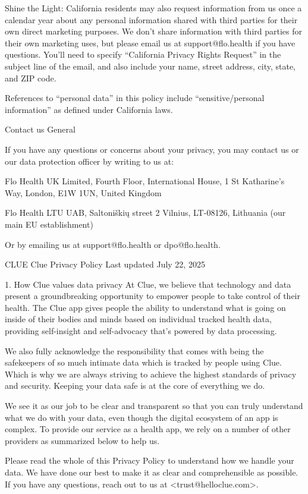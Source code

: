 Shine the Light: California residents may also request information from us once a calendar year about any personal information shared with third parties for their own direct marketing purposes. We don’t share information with third parties for their own marketing uses, but please email us at support@flo.health if you have questions. You’ll need to specify “California Privacy Rights Request” in the subject line of the email, and also include your name, street address, city, state, and ZIP code. 

References to “personal data” in this policy include “sensitive/personal information” as defined under California laws.

Contact us
General

If you have any questions or concerns about your privacy, you may contact us or our data protection officer by writing to us at:

Flo Health UK Limited, Fourth Floor, International House, 1 St Katharine’s Way, London, E1W 1UN, United Kingdom

Flo Health LTU UAB, Saltoniškių street 2 Vilnius, LT-08126, Lithuania (our main EU establishment)

Or by emailing us at support@flo.health or dpo@flo.health.


CLUE
Clue Privacy Policy
Last updated July 22, 2025

1. How Clue values data privacy
At Clue, we believe that technology and data present a groundbreaking opportunity to empower people to take control of their health. The Clue app gives people the ability to understand what is going on inside of their bodies and minds based on individual tracked health data, providing self-insight and self-advocacy that’s powered by data processing.

We also fully acknowledge the responsibility that comes with being the safekeepers of so much intimate data which is tracked by people using Clue. Which is why we are always striving to achieve the highest standards of privacy and security. Keeping your data safe is at the core of everything we do.

We see it as our job to be clear and transparent so that you can truly understand what we do with your data, even though the digital ecosystem of an app is complex. To provide our service as a health app, we rely on a number of other providers as summarized below to help us.

Please read the whole of this Privacy Policy to understand how we handle your data. We have done our best to make it as clear and comprehensible as possible. If you have any questions, reach out to us at <trust@helloclue.com>.

